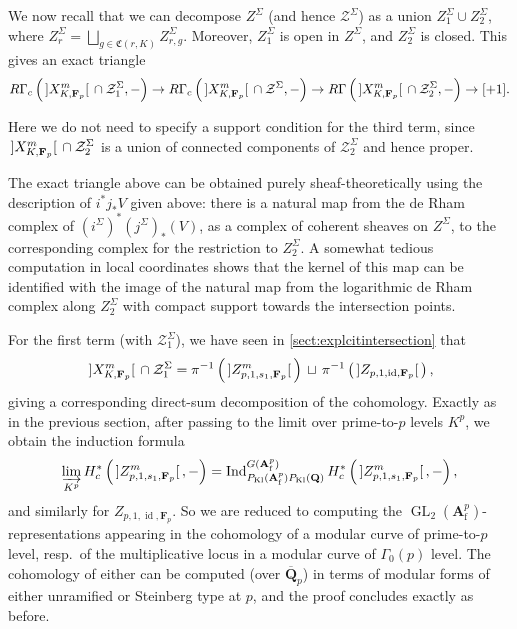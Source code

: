 \documentclass[cjm]{ipart}
\theoremstyle{plain}
\theoremstyle{remark}
\DeclareMathOperator{\GL}{GL}
\DeclareMathOperator{\id}{id}
\DeclareMathOperator{\Kl}{Kl}
\DeclarePairedDelimiter{\tb}{{\,]}}{{[\, }} %
\newcommand{\Af}{\AA_{\mathrm{f}}}
\newcommand{\Fp}{\mathbf{F}_p}
\newcommand{\QQbar}{\overline{\QQ}}
\newcommand{\QQ}{\mathbf{Q}}
\newcommand{\cZ}{\mathcal{Z}}
\renewcommand{\AA}{\mathbf{A}}
\numberwithin{equation}{subsection}
\begin{document}
  We now recall that we can decompose $Z^{\Sigma}$ (and hence $\mathcal{Z}^{\Sigma}$) as a union $Z^{\Sigma}_1 \cup Z_2^{\Sigma}$, where $Z^{\Sigma}_r = \bigsqcup_{g \in \mathfrak{C}(r, K)} Z^{\Sigma}_{r, g}$. Moreover, $Z_1^{\Sigma}$ is open in $Z^{\Sigma}$, and $Z_2^{\Sigma}$ is closed. This gives an exact triangle
  \[ 
   R\Gamma_c\left(\tb{X_{K, \Fp}^{m}} \cap \mathcal{Z}^{\Sigma}_1, -\right) \to 
   R\Gamma_c\left(\tb{X_{K, \Fp}^{m}} \cap \mathcal{Z}^{\Sigma}, -\right) \to 
   R\Gamma\left(\tb{X_{K, \Fp}^{m}} \cap \mathcal{Z}_2^{\Sigma}, -\right)  \to [+1]. \]
  
  \begin{remark}
   Here we do not need to specify a support condition for the third term, since $\tb{X_{K, \Fp}^{m}} \cap \mathcal{Z}_2^{\Sigma}$ is a union of connected components of $\mathcal{Z}_2^{\Sigma}$ and hence proper.
   
   The exact triangle above can be obtained purely sheaf-theoretically using the description of $i^* j_* V$ given above: there is a natural map from the de Rham complex of $(i^{\Sigma})^* (j^\Sigma)_*(V)$, as a complex of coherent sheaves on $Z^{\Sigma}$, to the corresponding complex for the restriction to $Z_2^{\Sigma}$. A somewhat tedious computation in local coordinates shows that the kernel of this map can be identified with the image of the natural map from the logarithmic de Rham complex along $Z_2^{\Sigma}$ with compact support towards the intersection points.
  \end{remark}
  
  For the first term (with $\mathcal{Z}^{\Sigma}_1$), we have seen in \cref{sect:explcitintersection} that  
  \[ \tb{X_{K, \Fp}^{m}} \cap \cZ^{\Sigma}_1 = \pi^{-1} \left(\tb{Z^m_{p, 1, s_1, \Fp}}\right)\, \sqcup\, \pi^{-1}\left(\tb{Z_{p, 1, \id, \Fp}}\right),\]
  giving a corresponding direct-sum decomposition of the cohomology. Exactly as in the previous section, after passing to the limit over prime-to-$p$ levels $K^p$, we obtain the induction formula
  \[ \varinjlim_{K^p} H^*_c\left(\tb{Z^m_{p, 1, s_1, \Fp}}, -\right) = \operatorname{Ind}_{P_{\Kl}(\Af^p)P_{\Kl}(\QQ)}^{G(\Af^p)}
  H^*_c\left(\tb{Z^m_{p, 1, s_1, \Fp}}, - \right),\]
  and similarly for $Z_{p, 1, \id, \Fp}$. So we are reduced to computing the $\GL_2(\Af^p)$-representations appearing in the cohomology of a modular curve of prime-to-$p$ level, resp.~of the multiplicative locus in a modular curve of $\Gamma_0(p)$ level. The cohomology of either can be computed (over $\QQbar_p$) in terms of modular forms of either unramified or Steinberg type at $p$, and the proof concludes exactly as before.
  
\end{document}
